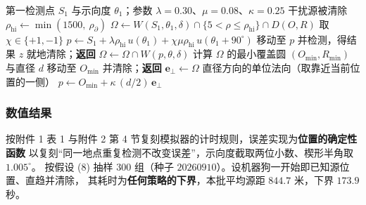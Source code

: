 \documentclass[withoutpreface, bwprint]{cumcmthesis}
\begin{document}
\begin{algorithm}[H]
  \caption{基于集员估计与代价加权的单源定位清除策略}
  \label{alg:p2}
  \begin{algorithmic}[1]
    \Require 第一检测点 $S_1$ 与示向度 $\theta_1$；参数 $\lambda=0.30$、$\mu=0.08$、$\kappa=0.25$
    \Ensure 干扰源被清除
    \State $\rho_{\mathrm{hi}}\gets\min(1500,\ \rho_\partial)$ 
    \State $\Omega\gets W(S_1,\theta_1,\delta)\cap\{5<\rho\le\rho_{\mathrm{hi}}\}\cap D(O,R)$
    \State 取 $\chi\in\{+1,-1\}$ 
    \State $p\gets S_1+\lambda\rho_{\mathrm{hi}}\,u(\theta_1)+\chi\mu\rho_{\mathrm{hi}}\,u(\theta_1+90^\circ)$
      \State 移动至 $p$ 并检测，得结果 $z$
       \State 就地清除；\textbf{返回} \EndIf
       \State $\Omega\gets\Omega\cap W(p,\theta,\delta)$ \EndIf
      \State 计算 $\Omega$ 的最小覆盖圆 $(O_{\min},R_{\min})$ 与直径 $d$
       \State 移动至 $O_{\min}$ 并清除；\textbf{返回} \EndIf
      \State $\boldsymbol e_\perp\gets\Omega$ 直径方向的单位法向（取靠近当前位置的一侧）
      \State $p\gets O_{\min}+\kappa\,(d/2)\,\boldsymbol e_\perp$ 
    \EndWhile
  \end{algorithmic}
\end{algorithm}

\subsubsection{数值结果}
\label{sec:p2num}

按附件 1 表 1 与附件 2 第 4 节复刻模拟器的计时规则，误差实现为\textbf{位置的确定性函数}
以复刻“同一地点重复检测不改变误差”，示向度截取两位小数、楔形半角取 $1.005^\circ$。
按假设 (8) 抽样 $300$ 组（种子 $20260910$）。设机器狗一开始即已知源位置、直趋并清除，
其耗时为\textbf{任何策略的下界}，本批平均源距 $844.7$ 米，下界 $173.9$ 秒。
\end{document}
